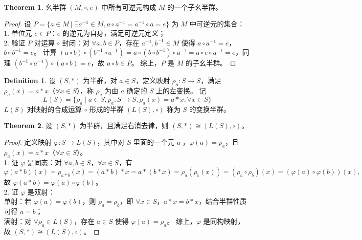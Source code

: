 \documentclass[oneside]{book}
\theoremstyle{definition}
\newtheorem{definition}{Definition}[section]
\newtheorem{theorem}{Theorem}[section]
\begin{document}
\begin{theorem}
	幺半群 \( (M, \circ, e) \) 中所有可逆元构成 \( M \) 的一个子幺半群。
\end{theorem}

\begin{proof}
	设 \( P = \{ a \in M \mid \exists a^{-1} \in M, a \circ a^{-1} = a^{-1} \circ a = e \} \) 为 \( M \) 中可逆元的集合：\\
	1. 单位元 \( e \in P \)：\( e \) 的逆元为自身，满足可逆元定义；\\
	2. 验证 \( P \) 对运算 \( \circ \) 封闭：对 \( \forall a, b \in P \)，存在 \( a^{-1}, b^{-1} \in M \) 使得 \( a \circ a^{-1} = e \)，\( b \circ b^{-1} = e \)。
	计算 \( (a \circ b) \circ (b^{-1} \circ a^{-1}) = a \circ (b \circ b^{-1}) \circ a^{-1} = a \circ e \circ a^{-1} = e \)，同理 \( (b^{-1} \circ a^{-1}) \circ (a \circ b) = e \)，故 \( a \circ b \in P \)。
	综上，\( P \) 是 \( M \) 的子幺半群。
\end{proof}

\begin{definition}
	设 \( (S, *) \) 为半群，对 \(  a \in S \)，定义映射 \( \rho_a: S \to S \)，满足 \( \rho_a(x) = a * x \)（\( \forall x \in S \)），称 \( \rho_a \) 为由 \( a \) 确定的 \( S \) 上的左变换。
	记 \[ L(S) = \{ \rho_a \mid a \in S,\rho_a: S \to S, \rho_a(x) = a * x, \forall x \in S \} \] \( L(S) \) 对映射的合成运算 \( \circ \) 形成的半群 \( (L(S), \circ) \) 称为 \( S \) 的变换半群。
\end{definition}

\begin{theorem}
	设 \( (S, *) \) 为半群，且满足右消去律，则 \( (S, *) \cong (L(S), \circ) \)。
\end{theorem}

\begin{proof}
	定义映射 \( \varphi: S \to L(S) \)，其中对 \(S\) 里面的一个元 \(a\) ，\( \varphi(a) = \rho_a \)，且 \( \rho_a(x) = a * x \)（\( \forall x \in S \)）。\\
	1. 证 \( \varphi \) 是同态：对 \( \forall a, b \in S \)，\( \forall x \in S \)，有
	\[
	\varphi(a * b)(x) = \rho_{a*b}(x) = (a * b) * x = a * (b * x) = \rho_a(\rho_b(x)) = (\rho_a \circ \rho_b)(x) = (\varphi(a) \circ \varphi(b))(x),
	\]
	故 \( \varphi(a * b) = \varphi(a) \circ \varphi(b) \)。\\
	2. 证 \( \varphi \) 是双射：\\
	单射：若 \( \varphi(a) = \varphi(b) \)，则 \( \rho_a = \rho_b \)，即 \( \forall x \in S \)，\( a * x = b * x \)，结合半群性质可得 \( a = b \)；\\
	满射：对 \( \forall \rho_a \in L(S) \)，存在 \( a \in S \) 使得 \( \varphi(a) = \rho_a \)。
	综上，\( \varphi \) 是同构映射，故 \( (S, *) \cong (L(S), \circ) \)。
\end{proof}
\end{document}
